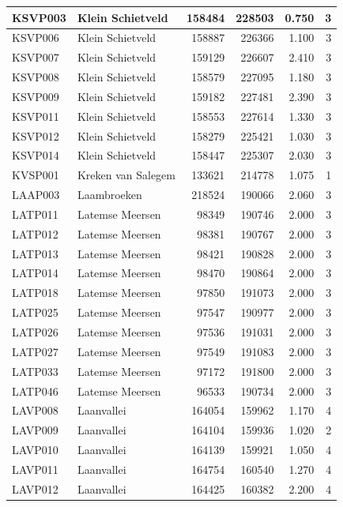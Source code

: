 \documentclass[11pt,]{book}
\begin{document}
\begin{table}
\begin{tabular}[t]{l|l|r|r|r|r}
\hline
KSVP003 & Klein Schietveld & 158484 & 228503 & 0.750 & 3\\
\hline
KSVP006 & Klein Schietveld & 158887 & 226366 & 1.100 & 3\\
\hline
KSVP007 & Klein Schietveld & 159129 & 226607 & 2.410 & 3\\
\hline
KSVP008 & Klein Schietveld & 158579 & 227095 & 1.180 & 3\\
\hline
KSVP009 & Klein Schietveld & 159182 & 227481 & 2.390 & 3\\
\hline
KSVP011 & Klein Schietveld & 158553 & 227614 & 1.330 & 3\\
\hline
KSVP012 & Klein Schietveld & 158279 & 225421 & 1.030 & 3\\
\hline
KSVP014 & Klein Schietveld & 158447 & 225307 & 2.030 & 3\\
\hline
KVSP001 & Kreken van Salegem & 133621 & 214778 & 1.075 & 1\\
\hline
LAAP003 & Laambroeken & 218524 & 190066 & 2.060 & 3\\
\hline
LATP011 & Latemse Meersen & 98349 & 190746 & 2.000 & 3\\
\hline
LATP012 & Latemse Meersen & 98381 & 190767 & 2.000 & 3\\
\hline
LATP013 & Latemse Meersen & 98421 & 190828 & 2.000 & 3\\
\hline
LATP014 & Latemse Meersen & 98470 & 190864 & 2.000 & 3\\
\hline
LATP018 & Latemse Meersen & 97850 & 191073 & 2.000 & 3\\
\hline
LATP025 & Latemse Meersen & 97547 & 190977 & 2.000 & 3\\
\hline
LATP026 & Latemse Meersen & 97536 & 191031 & 2.000 & 3\\
\hline
LATP027 & Latemse Meersen & 97549 & 191083 & 2.000 & 3\\
\hline
LATP033 & Latemse Meersen & 97172 & 191800 & 2.000 & 3\\
\hline
LATP046 & Latemse Meersen & 96533 & 190734 & 2.000 & 3\\
\hline
LAVP008 & Laanvallei & 164054 & 159962 & 1.170 & 4\\
\hline
LAVP009 & Laanvallei & 164104 & 159936 & 1.020 & 2\\
\hline
LAVP010 & Laanvallei & 164139 & 159921 & 1.050 & 4\\
\hline
LAVP011 & Laanvallei & 164754 & 160540 & 1.270 & 4\\
\hline
LAVP012 & Laanvallei & 164425 & 160382 & 2.200 & 4\\
\hline

\end{tabular}
\end{table}
\end{document}
